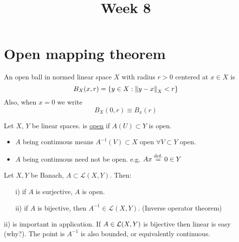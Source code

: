 \documentclass{article}
\title{Week 8}
\begin{document}
\author{\aut}
\maketitle
\section{Open mapping theorem}
\begin{definition}\nl
An open ball in normed linear space $X$ with radius $r>0$ centered at $x\in X$ is
$$
B_X(x,r)=\{y\in X:\left\|{y-x}\right\|_X<r\}
$$
Also, when $x=0$ we write 
$$
B_X(0,r)\equiv B_x(r)
$$
\end{definition}

\begin{definition}\nl
	Let $X$, $Y$ be linear spaces.  is {\underline{open}} if $A(U)\subset Y $ is open.
\end{definition}
\begin{remark}
\phantom{something}
\begin{itemize}
    \item $A$ being continuous means $A^{-1}(V)\subset{X}$ open $\forall V\subset Y$ open.
    \item $A$ being continuous need not be open. e.g. $Ax \stackrel{\text{def.}}{=} 0\in Y$
\end{itemize}
\end{remark}

\begin{theorem}\nl
\label{open mapping theorem}
	Let $X,Y$ be Banach, $A\subset\mathcal{L}(X,Y)$. Then:
	\begin{itemize}
	    \item[i)] if $A$ is surjective, $A$ is open.
	    \item[ii)] if $A$ is bijective, then $A^{-1}\in \mathcal{L}(X,Y)$. (Inverse operator theorem)
	\end{itemize}
\end{theorem}

\begin{remark}\nl
ii) is important in application. If $A\in\mathcal{L}({X},{Y})$ is bijective then  linear is easy (why?). The point is $A^{-1}$ is also bounded, or equivalently continuous.
\end{remark}
\end{document}
